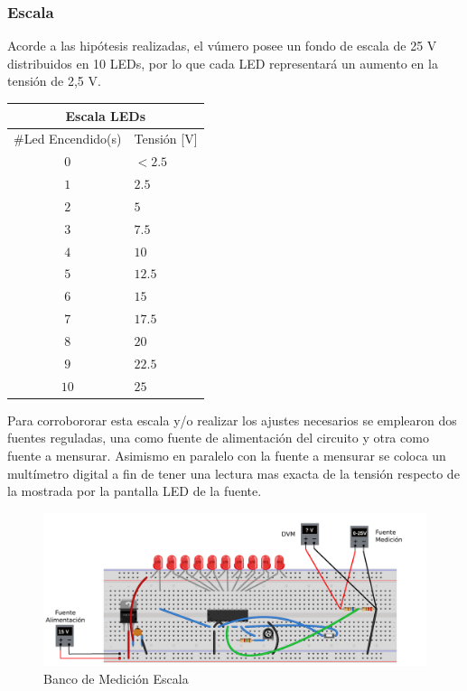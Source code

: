 \documentclass[12pt,a4paper]{article}
\begin{document}
			\subsubsection{Escala}
				Acorde a las hipótesis realizadas, el vúmero posee un fondo de escala de 25 V distribuidos en 10 LEDs, por lo que cada LED representará un aumento en la tensión de 2,5 V. 

				\begin{center}
			{\footnotesize \begin{tabular}{ |c|l| }

			\hline
				\multicolumn{2}{|c|}{\textbf{Escala LEDs}}\\ \hline
				$\#$Led Encendido(s) & Tensión [V] \\ \hline
				$0$ & $< 2.5$ \\ \hline
				$1$ & $2.5$ \\ \hline
				$2$ & $5$ \\ \hline
				$3$ & $7.5$ \\ \hline
				$4$ & $10$ \\ \hline
				$5$ & $12.5$ \\ \hline
				$6$ & $15$ \\ \hline
				$7$ & $17.5$ \\ \hline
				$8$ & $20$ \\ \hline
				$9$ & $22.5$ \\ \hline
				$10$ & $25$ \\ \hline			
 				
				
			\end{tabular}}\label{tab:escala}
			\end{center}

			Para corrobororar esta escala y/o realizar los ajustes necesarios se emplearon dos fuentes reguladas, una como fuente de alimentación del circuito y otra como fuente a mensurar. Asimismo en paralelo con la fuente a mensurar se coloca un multímetro digital a fin de tener una lectura mas exacta de la tensión respecto de la mostrada por la pantalla LED de la fuente.

			\begin{figure}[H]
			\centering
				\includegraphics[scale=0.8]{images/banco1.pdf}\caption{Banco de Medición Escala}\label{fig:banco1}
			\end{figure}
\end{document}
